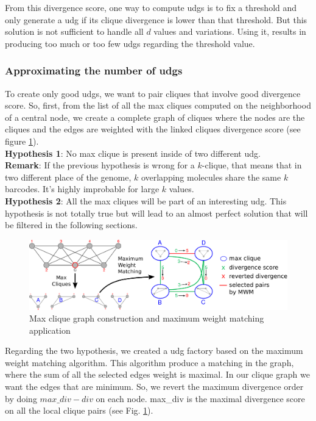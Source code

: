 \documentclass{article}
\begin{document}
From this divergence score, one way to compute udgs is to fix a threshold and only generate a udg if its clique divergence is lower than that threshold.
But this solution is not sufficient to handle all $d$ values and variations.
Using it, results in producing too much or too few udgs regarding the threshold value.

\subsubsection*{Approximating the number of udgs}

To create only good udgs, we want to pair cliques that involve good divergence score.
So, first, from the list of all the max cliques computed on the neighborhood of a central node, we create a complete graph of cliques where the nodes are the cliques and the edges are weighted with the linked cliques divergence score (see figure \ref{fig:mwm}).\\
\textbf{Hypothesis 1}: No max clique is present inside of two different udg.\\
\textbf{Remark}: If the previous hypothesis is wrong for a $k$-clique, that means that in two different place of the genome, $k$ overlapping molecules share the same $k$ barcodes. It's highly improbable for large $k$ values.\\
\textbf{Hypothesis 2}: All the max cliques will be part of an interesting udg. This hypothesis is not totally true but will lead to an almost perfect solution that will be filtered in the following sections.

\begin{figure}[htp]
    \centering
    \includegraphics[width=\textwidth]{mwm.pdf}
    \caption{Max clique graph construction and maximum weight matching application}
    \label{fig:mwm}
\end{figure}

Regarding the two hypothesis, we created a udg factory based on the maximum weight matching algorithm.
This algorithm produce a matching in the graph, where the sum of all the selected edges weight is maximal.
In our clique graph we want the edges that are minimum.
So, we revert the maximum divergence order by doing $max\_div - div$ on each node. max\_div is the maximal divergence score on all the local clique pairs (see Fig. \ref{fig:mwm}).
\end{document}
